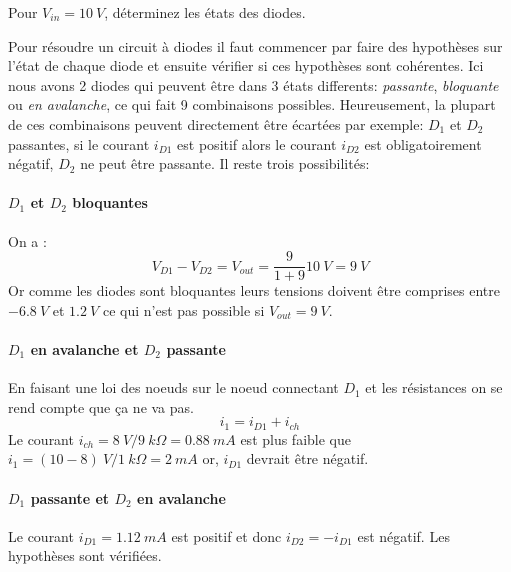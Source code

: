 \documentclass{../template/tp}
\begin{document}
\Question
{
    Pour $ V_{in} = 10~V $, déterminez les états des diodes.
}{
    Pour résoudre un circuit à diodes il faut commencer par faire des hypothèses sur l'état de chaque diode et ensuite vérifier si ces hypothèses sont cohérentes. Ici nous avons 2 diodes qui peuvent être dans 3 états differents: \textit{passante}, \textit{bloquante} ou \textit{en avalanche}, ce qui fait 9 combinaisons possibles. Heureusement, la plupart de ces combinaisons peuvent directement être écartées par exemple: $ D_{1} $ et $ D_{2} $ passantes, si le courant $ i_{D1} $ est positif alors le courant $ i_{D2} $ est obligatoirement négatif, $ D_{2} $ ne peut être passante. Il reste trois possibilités:
    
    \paragraph{$ D_{1} $ et $ D_{2} $ bloquantes} 
    On a :
    \[ V_{D1} - V_{D2} = V_{out} = \frac{9}{1+9} 10~V = 9~V \]
    Or comme les diodes sont bloquantes leurs tensions doivent être comprises entre $ -6.8~V $ et $ 1.2~V $ ce qui n'est pas possible si $ V_{out} = 9~V $.
    
    \paragraph{$ D_{1} $ en avalanche et $ D_{2} $ passante}
    En faisant une loi des noeuds sur le noeud connectant $ D_{1} $ et les résistances on se rend compte que ça ne va pas.
    \[
        i_{1} = i_{D1} + i_{ch} 
    \]
    Le courant $ i_{ch} = 8~V / 9~k\Omega = 0.88~mA $ est plus faible que $ i_{1} = (10-8)~V / 1~k\Omega = 2~mA $ or, $ i_{D1} $ devrait être négatif.
    
    \paragraph{$ D_{1} $ passante et $ D_{2} $ en avalanche}
    Le courant $ i_{D1} = 1.12~mA $ est positif et donc $ i_{D2} = - i_{D1} $ est négatif.
    Les hypothèses sont vérifiées.
    
}
\end{document}
